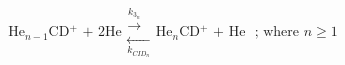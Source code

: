 \begin{equation}
    \text{He$_{n-1}$CD$^+$ + 2He}
    \substack{\overset{k_{3_n}} \longrightarrow \\ \underset{k_{CID_n}} \longleftarrow}
    \text{He$_n$CD$^+$ + He }
    \text{ ; where $n\geq 1$}
    \label{eqn:rate}
\end{equation}